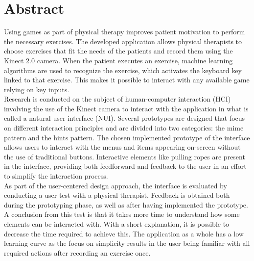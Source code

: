 \chapter*{Abstract}

Using games as part of physical therapy improves patient motivation to perform the necessary exercises. The developed application allows physical therapists to choose exercises that fit the needs of the patients and record them using the Kinect 2.0 camera. When the patient executes an exercise, machine learning algorithms are used to recognize the exercise, which activates the keyboard key linked to that exercise. This makes it possible to interact with any available game relying on key inputs.\\

Research is conducted on the subject of human-computer interaction (HCI) involving the use of the Kinect camera to interact with the application in what is called a natural user interface (NUI). Several prototypes are designed that focus on different interaction principles and are divided into two categories: the mime pattern and the hints pattern. The chosen implemented prototype of the interface allows users to interact with the menus and items appearing on-screen without the use of traditional buttons. Interactive elements like pulling ropes are present in the interface, providing both feedforward and feedback to the user in an effort to simplify the interaction process.\\

As part of the user-centered design approach, the interface is evaluated by conducting a user test with a physical therapist. Feedback is obtained both during the prototyping phase, as well as after having implemented the prototype. A conclusion from this test is that it takes more time to understand how some elements can be interacted with. With a short explanation, it is possible to decrease the time required to achieve this. The application as a whole has a low learning curve as the focus on simplicity results in the user being familiar with all required actions after recording an exercise once.\\




